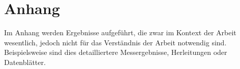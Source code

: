 \chapter{Anhang}\label{ch:appCh1}
Im Anhang werden Ergebnisse aufgeführt, die zwar im Kontext der Arbeit wesentlich, jedoch nicht für das Verständnis der Arbeit notwendig sind. Beispielsweise sind dies detailliertere Messergebnisse, Herleitungen oder Datenblätter. 